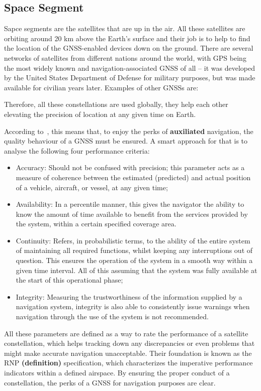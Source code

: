 \subsection{Space Segment}\label{sec:II_gnss_space_seg}

Sapce segments are the satellites that are up in the air. All these satellites are orbiting around 20 km above the Earth's surface and their job is to help to find the location of the GNSS-enabled devices down on the ground.
There are several networks of satellites from different nations around the world, with GPS being the most widely known and navigation-associated GNSS of all -- it was developed by the United States Department of Defense for military purposes, but was made available for civilian years later. %
Examples of other GNSSs are:

Therefore, all these constellations are used globally, they help each other elevating the precision of location at any given time on Earth.

According to~\cite{fed_rad_plan_2008}, this means that, to enjoy the perks of \textbf{auxiliated} navigation, the quality behaviour of a GNSS must be ensured. A smart approach for that is to analyse the following four performance criteria:

\begin{itemize}
    \item Accuracy: Should not be confused with precision; this parameter acts as a measure of coherence between the estimated (predicted) and actual position of a vehicle, aircraft, or vessel, at any given time;
    \item Availability: In a percentile manner, this gives the navigator the ability to know the amount of time available to benefit from the services provided by the system, within a certain specified coverage area.
    \item Continuity: Refers, in probabilistic terms, to the ability of the entire system of maintaining all required functions, whilst keeping any interruptions out of question. This ensures the operation of the system in a smooth way within a given time interval. All of this assuming that the system was fully available at the start of this operational phase;
    \item Integrity: Measuring the trustworthiness of the information supplied by a navigation system, integrity is also able to consistently issue warnings when navigation through the use of the system is not recommended.
\end{itemize}
All these parameters are defined as a way to rate the performance of a satellite constellation, which helps tracking down any discrepancies or even problems that might make accurate navigation unacceptable.
Their foundation is known as the RNP \textbf{(definition)} specification, which characterizes the imperative performance indicators within a defined airspace. By ensuring the proper conduct of a constellation, the perks of a GNSS for navigation purposes are clear.

